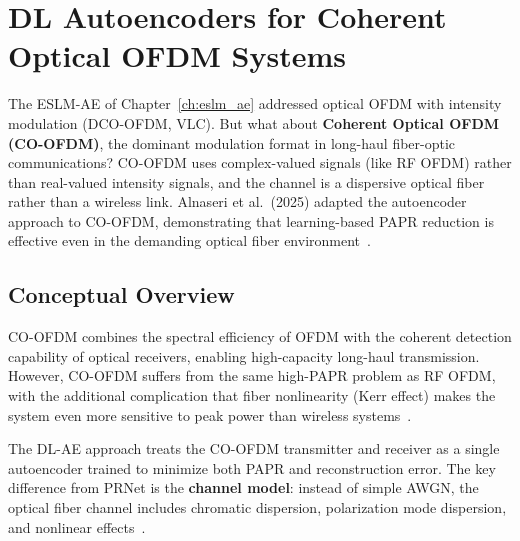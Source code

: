 \chapter{DL Autoencoders for Coherent Optical OFDM Systems}
\label{ch:dl_ae_optical}

\begin{motivation}
    The ESLM-AE of Chapter~\ref{ch:eslm_ae} addressed optical OFDM with
    intensity modulation (DCO-OFDM, VLC).  But what about
    \textbf{Coherent Optical OFDM (CO-OFDM)}, the dominant modulation
    format in long-haul fiber-optic communications?
    CO-OFDM uses complex-valued signals (like RF OFDM) rather than
    real-valued intensity signals, and the channel is a dispersive
    optical fiber rather than a wireless link.
    Alnaseri et al.\ (2025) adapted the autoencoder approach to CO-OFDM,
    demonstrating that learning-based PAPR reduction is effective even
    in the demanding optical fiber environment~\cite{alnaseri2025deep}.
\end{motivation}


\section{Conceptual Overview}
\label{sec:dlae_concept}

CO-OFDM combines the spectral efficiency of OFDM with the coherent detection
capability of optical receivers, enabling high-capacity long-haul
transmission.  However, CO-OFDM suffers from the same high-PAPR problem
as RF OFDM, with the additional complication that fiber nonlinearity
(Kerr effect) makes the system even more sensitive to peak power
than wireless systems~\cite{alnaseri2025deep}.

The DL-AE approach treats the CO-OFDM transmitter and receiver as a
single autoencoder trained to minimize both PAPR and reconstruction
error.  The key difference from PRNet is the \textbf{channel model}:
instead of simple AWGN, the optical fiber channel includes chromatic
dispersion, polarization mode dispersion, and nonlinear
effects~\cite{alnaseri2025deep}.


